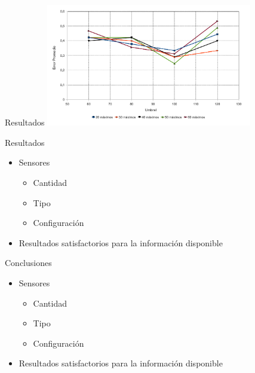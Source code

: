 \documentclass[spanish]{beamer}
\begin{document}
\begin{frame}{Resultados}
  \includegraphics[width=9cm]{../diagramas/estadistica_noche_iguales}
\end{frame}

\begin{frame}{Resultados}
  \begin{itemize}
  \item Sensores
    \begin{itemize}
    \item Cantidad
    \item Tipo
    \item Configuración
    \end{itemize}
  \item Resultados satisfactorios para la información disponible
  \end{itemize}
\end{frame}

\begin{frame}{Conclusiones}
  \begin{itemize}
  \item Sensores
    \begin{itemize}
    \item Cantidad
    \item Tipo
    \item Configuración
    \end{itemize}
  \item Resultados satisfactorios para la información disponible
  \end{itemize}
\end{frame}
\end{document}
